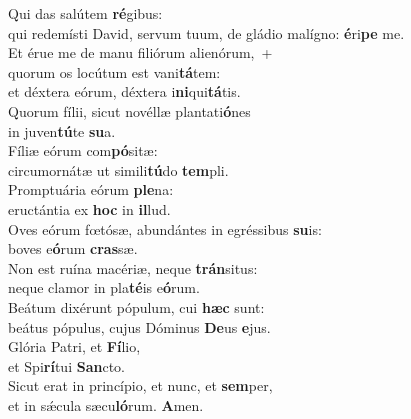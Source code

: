 \evenverse Qui das salútem \textbf{ré}gibus:~\*\\
\evenverse qui redemísti David, servum tuum, de gládio malígno: \textbf{é}ri\textbf{pe} me.\\
\oddverse Et érue me de manu filiórum alienórum,~+\\
\oddverse  quorum os locútum est vani\textbf{tá}tem:~\*\\
\oddverse et déxtera eórum, déxtera i\textbf{ni}qui\textbf{tá}tis.\\
\evenverse Quorum fílii, sicut novéllæ plantati\textbf{ó}nes~\*\\
\evenverse in juven\textbf{tú}te \textbf{su}a.\\
\oddverse Fíliæ eórum com\textbf{pó}sitæ:~\*\\
\oddverse circumornátæ ut simili\textbf{tú}do \textbf{tem}pli.\\
\evenverse Promptuária eórum \textbf{ple}na:~\*\\
\evenverse eructántia ex \textbf{hoc} in \textbf{il}lud.\\
\oddverse Oves eórum fœtósæ, abundántes in egréssibus \textbf{su}is:~\*\\
\oddverse boves e\textbf{ó}rum \textbf{cras}sæ.\\
\evenverse Non est ruína macériæ, neque \textbf{trán}situs:~\*\\
\evenverse neque clamor in pla\textbf{té}is e\textbf{ó}rum.\\
\oddverse Beátum dixérunt pópulum, cui \textbf{hæc} sunt:~\*\\
\oddverse beátus pópulus, cujus Dóminus \textbf{De}us \textbf{e}jus.\\
\evenverse Glória Patri, et \textbf{Fí}lio,~\*\\
\evenverse et Spi\textbf{rí}tui \textbf{San}cto.\\
\oddverse Sicut erat in princípio, et nunc, et \textbf{sem}per,~\*\\
\oddverse et in sǽcula sæcu\textbf{ló}rum. \textbf{A}men.\\
